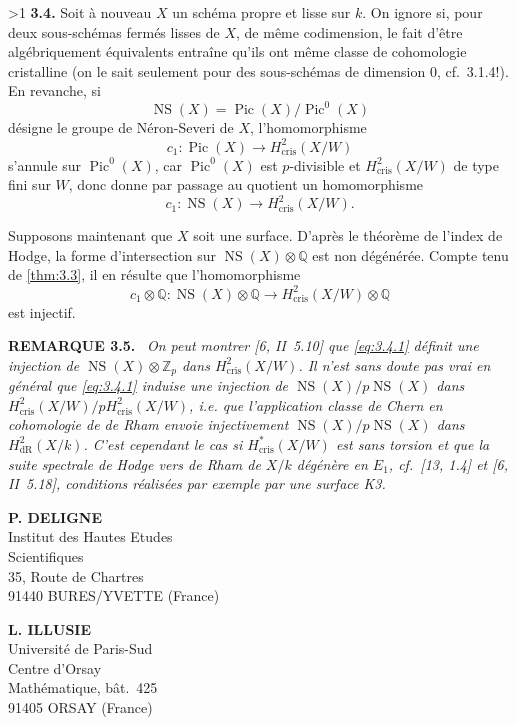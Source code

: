 \documentclass[10pt]{article}
\makeatletter
\DeclareMathOperator{\Pic}{Pic}
\DeclareMathOperator{\NS}{NS}
\newcommand{\cris}{\mathrm{cris}}
\newcommand{\sourceanchor}[2]{\begingroup\def\@currentlabel{#2}\label{#1}\endgroup}
\newenvironment{sourcestatement}[3]{\par\smallskip\noindent\textbf{#1 #2.}\sourceanchor{#3}{#2}\ \itshape}{\par\normalfont\smallskip}
\newcommand{\DPage}[2]{\ifnum#1>1\clearpage\fi\setcounter{page}{#2}}
\makeatother
\begin{document}
\DPage{21}{78}
\noindent\textbf{3.4.}
Soit à nouveau $X$ un schéma propre et lisse sur $k$. On ignore si, pour deux sous-schémas fermés lisses de $X$, de même codimension, le fait d'être algébriquement équivalents entraîne qu'ils ont même classe de cohomologie cristalline (on le sait seulement pour des sous-schémas de dimension $0$, cf.~3.1.4!). En revanche, si
\[
\NS(X) = \Pic(X)/\Pic^0(X)
\]
désigne le groupe de Néron-Severi de $X$, l'homomorphisme
\[
c_1: \Pic(X) \to H^2_{\cris}(X/W)
\]
s'annule sur $\Pic^0(X)$, car $\Pic^0(X)$ est $p$-divisible et $H^2_{\cris}(X/W)$ de type fini sur $W$, donc donne par passage au quotient un homomorphisme
\begin{equation}\tag{3.4.1}\label{eq:3.4.1}
c_1: \NS(X) \to H^2_{\cris}(X/W).
\end{equation}

Supposons maintenant que $X$ soit une surface. D'après le théorème de l'index de Hodge, la forme d'intersection sur $\NS(X) \otimes \mathbb{Q}$ est non dégénérée. Compte tenu de \ref{thm:3.3}, il en résulte que l'homomorphisme
\begin{equation}\tag{3.4.2}\label{eq:3.4.2}
c_1 \otimes \mathbb{Q}: \NS(X) \otimes \mathbb{Q} \to H^2_{\cris}(X/W) \otimes \mathbb{Q}
\end{equation}
est injectif.

\begin{sourcestatement}{REMARQUE}{3.5}{rem:3.5}
On peut montrer [6, II~5.10] que \eqref{eq:3.4.1} définit une injection de $\NS(X) \otimes \mathbb{Z}_p$ dans $H^2_{\cris}(X/W)$. Il n'est sans doute pas vrai en général que \eqref{eq:3.4.1} induise une injection de $\NS(X)/p\NS(X)$ dans $H^2_{\cris}(X/W)/pH^2_{\cris}(X/W)$, i.e. que l'application classe de Chern en cohomologie de de Rham envoie injectivement $\NS(X)/p\NS(X)$ dans $H^2_{\mathrm{dR}}(X/k)$. C'est cependant le cas si $H^*_{\cris}(X/W)$ est sans torsion et que la suite spectrale de Hodge vers de Rham de $X/k$ dégénère en $E_1$, cf.~[13, 1.4] et [6, II~5.18], conditions réalisées par exemple par une surface K3.
\end{sourcestatement}

\vspace{1cm}
\noindent
\begin{minipage}[t]{0.48\textwidth}
\textbf{P. DELIGNE}\\
Institut des Hautes Etudes\\
Scientifiques\\
35, Route de Chartres\\
91440 BURES/YVETTE (France)
\end{minipage}
\hfill
\begin{minipage}[t]{0.48\textwidth}
\textbf{L. ILLUSIE}\\
Université de Paris-Sud\\
Centre d'Orsay\\
Mathématique, bât.~425\\
91405 ORSAY (France)
\end{minipage}
\end{document}

